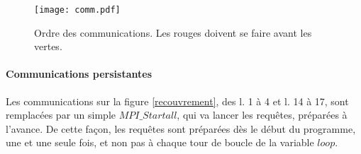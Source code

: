 \begin{figure}[!ht]
\centering
\texttt{[image: comm.pdf]}
\caption{Ordre des communications. Les rouges doivent se faire avant les vertes.}
\label{fig:comm}
\end{figure}

\paragraph{Communications persistantes}
Les communications sur la figure \ref{recouvrement}, des l. 1 à 4 et l. 14 à 17, sont remplacées par un simple $MPI\_Startall$, qui va lancer les requêtes, préparées à l'avance. De cette façon, les requêtes sont préparées dès le début du programme, une et une seule fois, et non pas à chaque tour de boucle de la variable $loop$. 